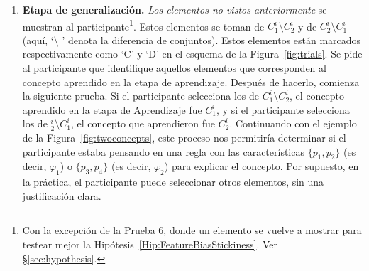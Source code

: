 \begin{enumerate}
	\item {\bf Etapa de generalización.} {\em Los elementos no vistos anteriormente} se muestran al participante\footnote{Con la excepción de la Prueba 6, donde un elemento se vuelve a mostrar para testear mejor la Hipótesis~\ref{Hip:FeatureBiasStickiness}. Ver \S\ref{sec:hypothesis}.}. Estos elementos se toman de $C^i_1 \setminus C^i_2$ y de $C^i_2 \setminus C^i_1$ (aquí, `$\setminus$ ' denota la diferencia de conjuntos). Estos elementos están marcados respectivamente como `{\sf C}' y `{\sf D}' en el esquema de la Figura~\ref{fig:trials}. Se pide al participante que identifique aquellos elementos que corresponden al concepto aprendido en la etapa de aprendizaje. Después de hacerlo, comienza la siguiente prueba. Si el participante selecciona los de $C^i_1 \setminus C^i_2$, el concepto aprendido en la etapa de Aprendizaje fue $C^i_1$, y si el participante selecciona los de $^i_2 \setminus C^i_1$, el concepto que aprendieron fue $C^i_2$.
    Continuando con el ejemplo de la Figura~\ref{fig:twoconcepts}, este proceso nos permitiría determinar si el participante estaba pensando en una regla con las características $\{p_1, p_2 \}$ (es decir, $\varphi_1$) o $\{p_3, p_4 \}$ (es decir, $\varphi_2$) para explicar el concepto. Por supuesto, en la práctica, el participante puede seleccionar otros elementos, sin una justificación clara.


\end{enumerate}
